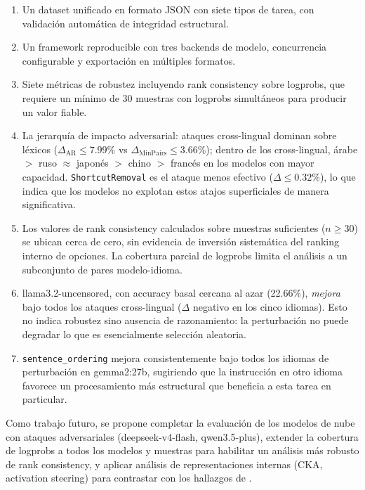 \documentclass[11pt]{article}
\begin{document}
\begin{enumerate}
  \item Un dataset unificado en formato JSON con siete tipos de tarea,
  con validación automática de integridad estructural.
 
  \item Un framework reproducible con tres backends de modelo,
  concurrencia configurable y exportación en múltiples formatos.
 
  \item Siete métricas de robustez incluyendo rank consistency sobre
  logprobs, que requiere un mínimo de 30 muestras con logprobs
  simultáneos para producir un valor fiable.
 
  \item La jerarquía de impacto adversarial: ataques cross-lingual
  dominan sobre léxicos ($\Delta_{\text{AR}} \leq 7.99\%$ vs
  $\Delta_{\text{MinPairs}} \leq 3.66\%$); dentro de los cross-lingual,
  árabe $>$ ruso $\approx$ japonés $>$ chino $>$ francés en los modelos
  con mayor capacidad.
  \texttt{ShortcutRemoval} es el ataque menos efectivo ($\Delta \leq
  0.32\%$), lo que indica que los modelos no explotan estos atajos
  superficiales de manera significativa.
 
  \item Los valores de rank consistency calculados sobre muestras
  suficientes ($n \geq 30$) se ubican cerca de cero, sin evidencia de
  inversión sistemática del ranking interno de opciones. La cobertura
  parcial de logprobs limita el análisis a un subconjunto de pares
  modelo-idioma.
 
  \item llama3.2-uncensored, con accuracy basal cercana al azar
  (22.66\%), \textit{mejora} bajo todos los ataques cross-lingual
  ($\Delta$ negativo en los cinco idiomas). Esto no indica robustez
  sino ausencia de razonamiento: la perturbación no puede degradar lo
  que es esencialmente selección aleatoria.
 
  \item \texttt{sentence\_ordering} mejora consistentemente bajo
  todos los idiomas de perturbación en gemma2:27b, sugiriendo que
  la instrucción en otro idioma favorece un procesamiento más
  estructural que beneficia a esta tarea en particular.
\end{enumerate}
 
Como trabajo futuro, se propone completar la evaluación de los modelos
de nube con ataques adversariales (deepseek-v4-flash, qwen3.5-plus),
extender la cobertura de logprobs a todos los modelos y muestras para
habilitar un análisis más robusto de rank consistency, y aplicar
análisis de representaciones internas (CKA, activation steering) para
contrastar con los hallazgos de \citet{languagespecific2025}.
\end{document}
